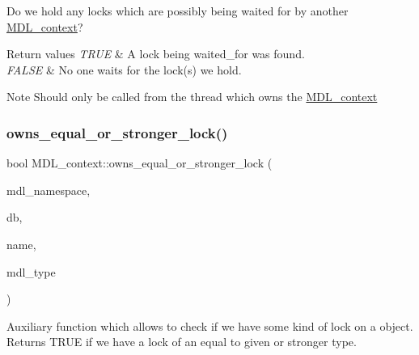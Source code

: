 Do we hold any locks which are possibly being waited for by another \mbox{\hyperlink{classMDL__context}{M\+D\+L\+\_\+context}}?


\begin{DoxyRetVals}{Return values}
{\em T\+R\+UE} & A lock being \textquotesingle{}waited\+\_\+for\textquotesingle{} was found. \\
\hline
{\em F\+A\+L\+SE} & No one waits for the lock(s) we hold.\\
\hline
\end{DoxyRetVals}
\begin{DoxyNote}{Note}
Should only be called from the thread which owns the \mbox{\hyperlink{classMDL__context}{M\+D\+L\+\_\+context}} 
\end{DoxyNote}
\mbox{\label{classMDL__context_adffac048f9ce71eb3a5e3b1a38178fdc}} 
\subsubsection{\texorpdfstring{owns\+\_\+equal\+\_\+or\+\_\+stronger\+\_\+lock()}{owns\_equal\_or\_stronger\_lock()}}
{\footnotesize\ttfamily bool M\+D\+L\+\_\+context\+::owns\+\_\+equal\+\_\+or\+\_\+stronger\+\_\+lock (\begin{DoxyParamCaption}\item[{\mbox{\hyperlink{structMDL__key_a391ec4bd98fec6852a48f7856546ed3b}{M\+D\+L\+\_\+key\+::enum\+\_\+mdl\+\_\+namespace}}}]{mdl\+\_\+namespace,  }\item[{const char $\ast$}]{db,  }\item[{const char $\ast$}]{name,  }\item[{enum\+\_\+mdl\+\_\+type}]{mdl\+\_\+type }\end{DoxyParamCaption})}

Auxiliary function which allows to check if we have some kind of lock on a object. Returns T\+R\+UE if we have a lock of an equal to given or stronger type.


